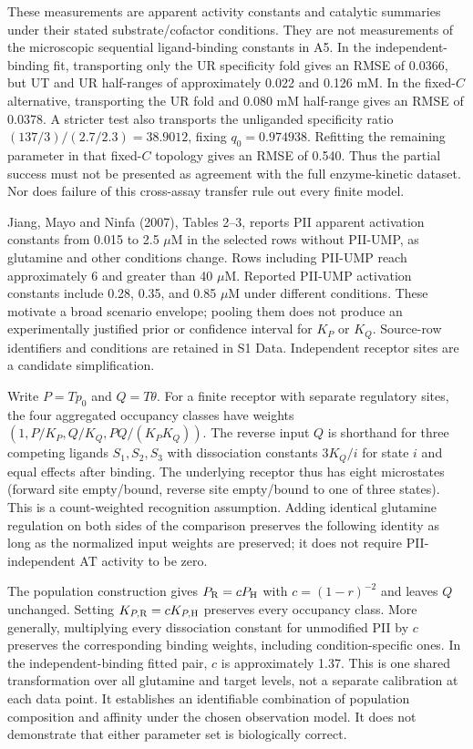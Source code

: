 \documentclass[11pt]{article}
\begin{document}
These measurements are apparent activity constants and catalytic summaries under their stated substrate/cofactor conditions. They are not measurements of the microscopic sequential ligand-binding constants in A5. In the independent-binding fit, transporting only the UR specificity fold gives an RMSE of 0.0366, but UT and UR half-ranges of approximately 0.022 and 0.126 mM. In the fixed-$C$ alternative, transporting the UR fold and 0.080 mM half-range gives an RMSE of 0.0378. A stricter test also transports the unliganded specificity ratio $(137/3)/(2.7/2.3)=38.9012$, fixing $q_0=0.974938$. Refitting the remaining parameter in that fixed-$C$ topology gives an RMSE of 0.540. Thus the partial success must not be presented as agreement with the full enzyme-kinetic dataset. Nor does failure of this cross-assay transfer rule out every finite model.

Jiang, Mayo and Ninfa (2007), Tables 2--3, reports PII apparent activation constants from 0.015 to 2.5 $\mu$M in the selected rows without PII-UMP, as glutamine and other conditions change. Rows including PII-UMP reach approximately 6 and greater than 40 $\mu$M. Reported PII-UMP activation constants include 0.28, 0.35, and 0.85 $\mu$M under different conditions. These motivate a broad scenario envelope; pooling them does not produce an experimentally justified prior or confidence interval for $K_P$ or $K_Q$. Source-row identifiers and conditions are retained in S1 Data. Independent receptor sites are a candidate simplification.

Write $P=T p_0$ and $Q=T\theta$. For a finite receptor with separate regulatory sites, the four aggregated occupancy classes have weights $(1,P/K_P,Q/K_Q,PQ/(K_PK_Q))$. The reverse input $Q$ is shorthand for three competing ligands $S_1,S_2,S_3$ with dissociation constants $3K_Q/i$ for state $i$ and equal effects after binding. The underlying receptor thus has eight microstates (forward site empty/bound, reverse site empty/bound to one of three states). This is a count-weighted recognition assumption. Adding identical glutamine regulation on both sides of the comparison preserves the following identity as long as the normalized input weights are preserved; it does not require PII-independent AT activity to be zero.

The population construction gives $P_{\rm R}=cP_{\rm H}$ with $c=(1-r)^{-2}$ and leaves $Q$ unchanged. Setting $K_{P,\rm R}=cK_{P,\rm H}$ preserves every occupancy class. More generally, multiplying every dissociation constant for unmodified PII by $c$ preserves the corresponding binding weights, including condition-specific ones. In the independent-binding fitted pair, $c$ is approximately 1.37. This is one shared transformation over all glutamine and target levels, not a separate calibration at each data point. It establishes an identifiable combination of population composition and affinity under the chosen observation model. It does not demonstrate that either parameter set is biologically correct.
\end{document}
